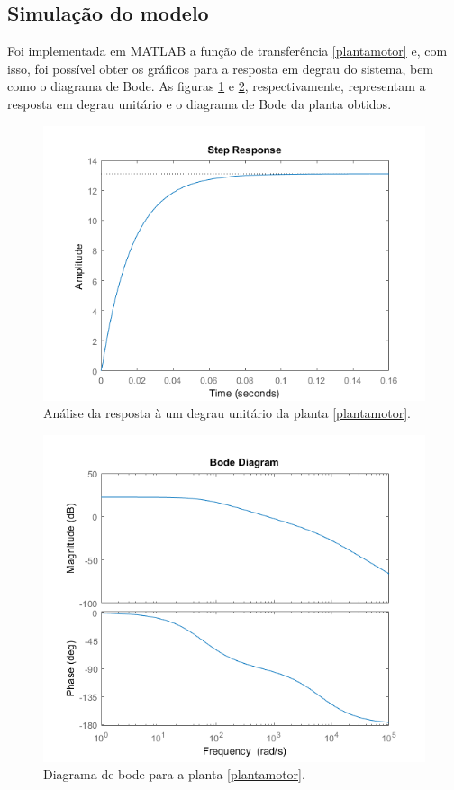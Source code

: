 \documentclass[a4paper,11pt]{article}
\begin{document}
		\newpage
		
		\subsection{Simulação do modelo}
		
		Foi implementada em MATLAB\cite{MATLAB} a função de transferência \ref{plantamotor} e, com isso, foi possível obter os gráficos para a resposta em degrau do sistema, bem como o diagrama de Bode. As figuras \ref{fig:respostaemdegrau} e \ref{fig:bode}, respectivamente, representam a resposta em degrau unitário e o diagrama de Bode da planta obtidos.
		
		\begin{figure}[ht]
			\centering
			\includegraphics[width=0.64\linewidth]{images/stepResponse}
			\caption{Análise da resposta à um degrau unitário da planta \ref{plantamotor}.}
			\label{fig:respostaemdegrau}
		\end{figure}
	
		\begin{figure}[ht]
			\centering
			\includegraphics[width=0.64\linewidth]{images/bode}
			\caption{Diagrama de bode para a planta \ref{plantamotor}.}
			\label{fig:bode}
		\end{figure}
		
\end{document}
